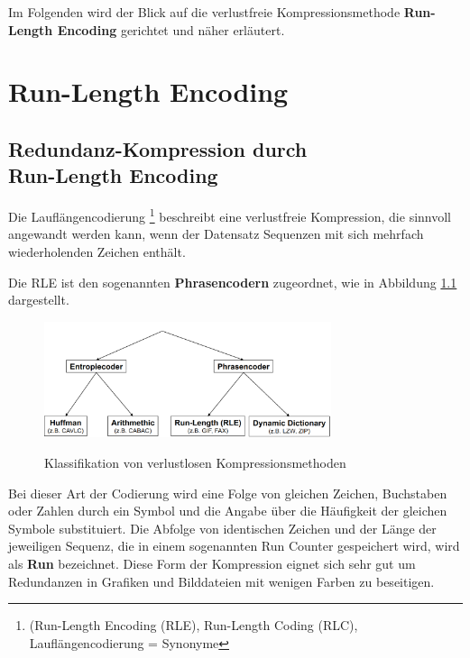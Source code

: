 \documentclass[11pt,a4paper,ngerman]{report}
\begin{document}
	
		Im Folgenden wird der Blick auf die verlustfreie Kompressionsmethode \textbf{Run-Length Encoding} gerichtet und näher erläutert.
	
	
	\chapter{Run-Length Encoding}	
  		\section{Redundanz-Kompression durch \\ Run-Length Encoding}
  		  Die Lauflängencodierung \footnote{(Run-Length Encoding (RLE), Run-Length Coding (RLC), Lauflängencodierung = Synonyme} beschreibt eine verlustfreie Kompression, die sinnvoll angewandt werden kann, wenn der Datensatz Sequenzen mit sich mehrfach wiederholenden Zeichen enthält.
  		  
  		  
  		  Die RLE ist den sogenannten \textbf{Phrasencodern} zugeordnet, wie in Abbildung \ref{MMK} dargestellt.
  		  
  		  \begin{figure} [H]
  		  	\begin{center}
  		  		\includegraphics[width=0.75\textwidth]{MMK_RLE.png}
  		  		\caption{Klassifikation von verlustlosen Kompressionsmethoden}
  		  		\cite{MMK}
  		  		\label{MMK}
  		  	\end{center}
  		  \end{figure}
  		  
  		  
  		  Bei dieser Art der Codierung wird eine Folge von gleichen Zeichen, Buchstaben oder Zahlen durch ein Symbol und die Angabe über die Häufigkeit der gleichen Symbole substituiert. Die Abfolge von identischen Zeichen und der Länge der jeweiligen Sequenz, die in einem sogenannten Run Counter gespeichert wird, wird als \textbf{Run} bezeichnet. Diese Form der Kompression eignet sich sehr gut um Redundanzen in Grafiken und Bilddateien mit wenigen Farben zu beseitigen.

  	   	  
\end{document}
